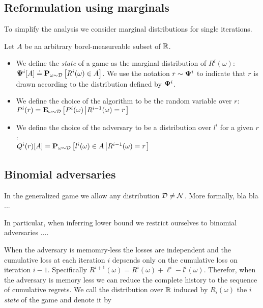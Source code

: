 \documentclass{article}[12pt]
\begin{document}
\subsection{Reformulation using marginals}

\newcommand{\Eomega}[1]{\E{\omega \sim \D}{#1}}
\newcommand{\Pomega}[1]{\P{\omega \sim \D}{#1}}

To simplify the analysis we consider marginal distributions for single iterations.

Let $A$ be an arbitrary borel-measureable subset of $\mathbb{R}$.

\begin{itemize}
\item We define the {\em state} of a game as the marginal distribution
  of $R^i(\omega)$: $\state^i[A] \doteq \Pomega{R^i(\omega) \in A}$.
  We use the notation $r \sim {\bf \Psi}^i$ to indicate that $r$
  is drawn according to the distribution defined by ${\bf \Psi}^i$.
\item We define the choice of the algorithm to be the random variable over $r$:
  $P^i(r) = \Eomega{P^i(\omega) \left| R^{i-1}(\omega) = r \right.}$
\item We define the choice of the adversary to be a distribution over $l^i$ for a given $r$:\\
  $Q^i(r)[A] = \Pomega{l^i(\omega) \in A  \left| R^{i-1}(\omega) = r \right.}$
\end{itemize}


\subsection{Binomial adversaries}
In the generalized game we allow any distribution ${\cal D} \neq {\cal N}$.
More formally, bla bla ...

In particular, when inferring lower bound we restrict ourselves to binomial adversaries ....


\iffalse
memory-less adversaries. In other words
adversaries to not depend on history. In other words: for any $1 \leq i \leq T$:
\begin{eqnarray}
  && \P{\omega \sim \D}{L^i(\omega)=b_i \left|
  P^i(\omega)=a_i\wedge (P^{i-1}(\omega)=a_{i-1} \wedge L^{i-1}(\omega)=b_{i-1})
     \wedge \ldots \wedge (P^{1}(\omega)=a_{1} \wedge L^1(\omega)=b_1) \right.} \nonumber\\
     &=&   \P{\omega \sim \D}{L^i(\omega)=b_i}
\end{eqnarray}
\fi

When the adversary is memomry-less the losses are independent and the cumulative loss at each iteration $i$ depsends only on the cumulative loss on iteration $i-1$. Specifically
$ R^{i+1}(\omega) = R^{i}(\omega) + \ell^i - l^i(\omega)$. Therefor, when the adversary is memory less we can reduce the complete history to the sequence of cumulative regrets. We call the distribution over $\mathbb{R}$
induced by $R_i(\omega)$ the $i$ {\em state} of the game and denote it by
\begin{equation}
\end{equation}
\end{document}
